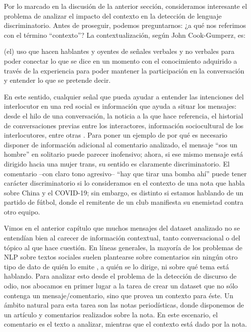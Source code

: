 \label{chap:05_dataset_creation}

Por lo marcado en la discusión de la anterior sección, consideramos interesante el problema de analizar el impacto del contexto en la detección de lenguaje discriminatorio. Antes de proseguir, podemos preguntarnos: ¿a qué nos referimos con el término ``contexto''? La contextualización, según John Cook-Gumperz, es:

\begin{displayquote}
    (el) uso que hacen hablantes y oyentes de señales verbales y no verbales para poder conectar lo que se dice en un momento con el conocimiento adquirido a través de la experiencia para poder mantener la participación en la conversación y entender lo que se pretende decir.
\end{displayquote}

En este sentido, cualquier señal que pueda ayudar a entender las intenciones del interlocutor en una red social es información que ayuda a situar los mensajes: desde el hilo de una conversación, la noticia a la que hace referencia, el historial de conversaciones previas entre los interactores, información sociocultural de los interlocutores, entre otras \cite{sheth2021defining}. Para poner un ejemplo de por qué es necesario disponer de información adicional al comentario analizado, el mensaje ``sos un hombre'' en solitario puede parecer inofensivo; ahora, si ese mismo mensaje está dirigido hacia una mujer trans, su sentido es claramente discriminatorio. El comentario --con claro tono agresivo-- ``hay que tirar una bomba ahí'' puede tener carácter discriminatorio si lo consideramos en el contexto de una nota que habla sobre China y el COVID-19; sin embargo, es distinto si estamos hablando de un partido de fútbol, donde el remitente de un club manifiesta su enemistad contra otro equipo.


Vimos en el anterior capítulo que muchos mensajes del dataset analizado no se entendían bien al carecer de información contextual, tanto conversacional o del tópico al que hace cuestión. En líneas generales, la mayoría de los problemas de NLP sobre textos sociales suelen plantearse sobre comentarios sin ningún otro tipo de dato de quién lo emite , a quién se lo dirige, ni sobre qué tema está hablando. Para analizar esto desde el problema de la detección de discurso de odio, nos abocamos en primer lugar a la tarea de crear un dataset que no sólo contenga un mensaje/comentario, sino que provea un contexto para éste. Un ámbito natural para esta tarea son las notas periodísticas, donde disponemos de un artículo y comentarios realizados sobre la nota. En este escenario, el comentario es el texto a analizar, mientras que el contexto está dado por la nota.

